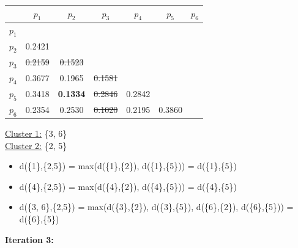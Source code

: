 \documentclass[11pt]{article}
\begin{document}
	\begin{center}
    	\begin{adjustbox}{max width=\textwidth}
		\begin{tabular}{ | c | c | c | c | c | c | c |}
	  	 	\hline

	  	 	& \textbf{$p_1$} & \textbf{$p_2$} & \textbf{$p_3$} & \textbf{$p_4$} & \textbf{$p_5$} & \textbf{$p_6$}\\
	  	 	\hline
	  	 	
	  	 	\textbf{$p_1$} &  &  &  &  &  &\\
	  	 	\hline
	  	 	
	  	 	\textbf{$p_2$} & 0.2421 &  &  &  &  &  \\
	  	 	\hline
	  	 	
	  	 	\textbf{$p_3$} & \st{0.2159} & \st{0.1523} &  &  &  & \\
	  	 	\hline
	  	 	
	  	 	\textbf{$p_4$} & 0.3677 & 0.1965 & \st{0.1581} &  &  & \\
	  	 	\hline
	  	 	
	  	 	\textbf{$p_5$} & 0.3418 & \textbf{0.1334} & \st{0.2846} & 0.2842 &  & \\
	  	 	\hline	
	  	 	
	  	 	\textbf{$p_6$} & 0.2354 & 0.2530 & \st{0.1020} & 0.2195 & 0.3860 & \\
	  	 	\hline			
    		\end{tabular}
    	\end{adjustbox}
	\end{center}
	
	\underline{Cluster 1:} \{3, 6\} \\
	\underline{Cluster 2:} \{2, 5\}
	
	\begin{itemize}
		\item d(\{1\},\{2,5\}) = max(d(\{1\},\{2\}), d(\{1\},\{5\})) = d(\{1\},\{5\})
		\item d(\{4\},\{2,5\}) = max(d(\{4\},\{2\}), d(\{4\},\{5\})) = d(\{4\},\{5\})
		\item d(\{3, 6\},\{2,5\}) = max(d(\{3\},\{2\}), d(\{3\},\{5\}), d(\{6\},\{2\}), d(\{6\},\{5\})) = d(\{6\},\{5\})
	\end{itemize}
	
	
	\textbf{Iteration 3:}
	
\end{document}
